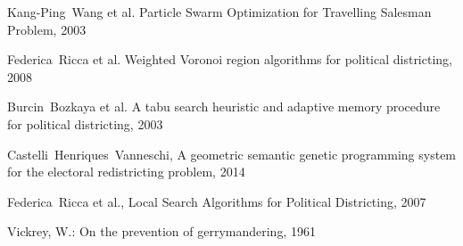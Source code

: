 \documentclass[journal]{IEEEtran}
\begin{document}
\begin{thebibliography}{1}

Kang-Ping~Wang et al. Particle Swarm Optimization for Travelling Salesman
        Problem, 2003

Federica~Ricca et al. Weighted Voronoi region algorithms for political
        districting, 2008

    Burcin~Bozkaya et al.  A tabu search heuristic and adaptive memory procedure
        for political districting, 2003

    Castelli~Henriques~Vanneschi, A geometric semantic genetic programming system for the electoral redistricting problem, 2014

    Federica~Ricca et al., Local Search Algorithms for Political Districting, 2007

Vickrey, W.: On the prevention of gerrymandering, 1961

\end{thebibliography}
\end{document}
